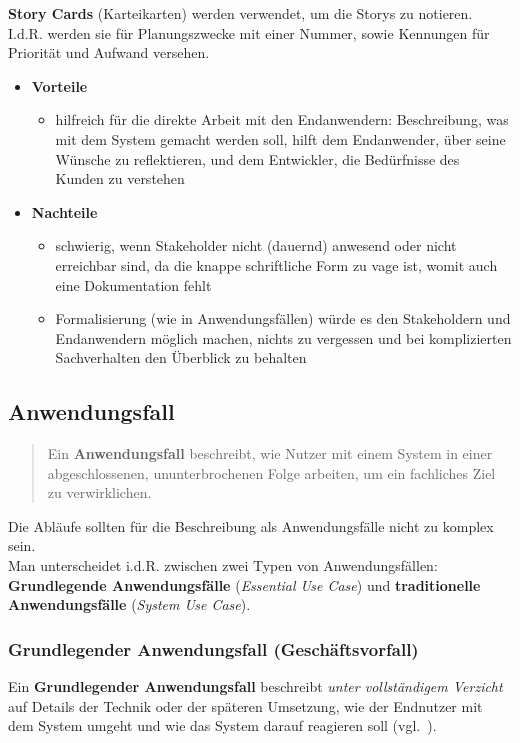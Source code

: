 \noindent
\textbf{Story Cards} (Karteikarten) werden verwendet, um die Storys zu notieren.\\
I.d.R. werden sie für Planungszwecke mit einer Nummer, sowie Kennungen für Priorität und Aufwand versehen.


\begin{itemize}
    \item \textbf{Vorteile}
        \begin{itemize}
            \item hilfreich für die direkte Arbeit mit den Endanwendern: Beschreibung, was mit dem System gemacht werden soll, hilft dem Endanwender, über seine Wünsche zu reflektieren, und dem Entwickler, die Bedürfnisse des Kunden zu verstehen
        \end{itemize}
    \item \textbf{Nachteile}
        \begin{itemize}
            \item schwierig, wenn Stakeholder nicht (dauernd) anwesend oder nicht erreichbar sind, da die knappe schriftliche Form zu vage ist, womit auch eine Dokumentation fehlt
            \item Formalisierung (wie in Anwendungsfällen) würde es den Stakeholdern und Endanwendern möglich machen, nichts zu vergessen und bei komplizierten Sachverhalten den Überblick zu behalten
        \end{itemize}
\end{itemize}

\subsection*{Anwendungsfall}
\blockquote[{\cite[67, Hervorhebung eigene]{Wed09}}]{Ein \textbf{Anwendungsfall} beschreibt, wie Nutzer mit einem System in einer abgeschlossenen, ununterbrochenen Folge arbeiten, um ein fachliches Ziel zu verwirklichen.}

\noindent
Die Abläufe sollten für die Beschreibung als Anwendungsfälle nicht zu komplex sein.\\

\noindent
Man unterscheidet i.d.R. zwischen zwei Typen von Anwendungsfällen: \textbf{Grundlegende Anwendungsfälle} (\textit{Essential Use Case}) und \textbf{traditionelle Anwendungsfälle} (\textit{System Use Case}).

\subsubsection*{Grundlegender Anwendungsfall (Geschäftsvorfall)}
Ein \textbf{Grundlegender Anwendungsfall} beschreibt \textit{unter vollständigem Verzicht} auf Details der Technik oder der späteren Umsetzung, wie der Endnutzer mit dem System umgeht und wie das System darauf reagieren soll (vgl.~\cite[68]{Wed09}).\\

